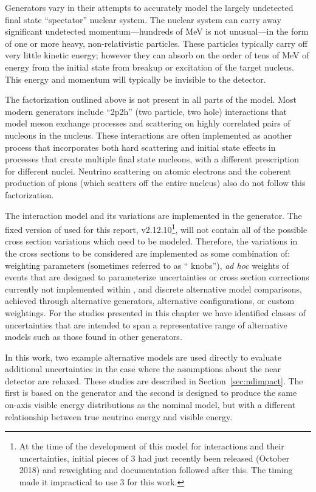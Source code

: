 Generators vary in their attempts to accurately model the largely undetected final state ``spectator'' nuclear system.  The nuclear system can carry away significant undetected momentum---hundreds of MeV is not unusual---in the form of one or more heavy, non-relativistic particles.  These particles typically carry off very little kinetic energy; however they can absorb on the order of tens of MeV of energy from the initial state from breakup or excitation of the target nucleus.  This energy and momentum will typically be invisible to the detector.


The factorization outlined above is not present in all parts of the model.  Most modern generators include ``2p2h'' (two particle, two hole) interactions that model meson exchange processes and scattering on highly correlated pairs of nucleons in the nucleus.  These interactions are often implemented as another process that incorporates both hard scattering and initial state effects in processes that create multiple final state nucleons, with a different prescription for different nuclei.
Neutrino scattering on atomic electrons and the coherent production of pions (which scatters off the entire nucleus) also
do not follow this factorization.

The interaction model and its variations are implemented in the   generator.  The fixed version of  used for this report, v2.12.10\footnote{At the time of the development of this model for interactions and their uncertainties, initial pieces of  3 had just recently been released (October 2018) and reweighting and documentation followed after this. The timing made it impractical to use  3 for this work.}, will not contain all of the possible cross section variations which need to be modeled.  Therefore, the variations in the cross sections to be considered are implemented as some combination of:  weighting parameters (sometimes referred to as `` knobs''), {\em ad hoc} weights of events that are designed to parameterize uncertainties or cross section corrections currently not implemented within , and discrete alternative model comparisons, achieved through alternative generators, alternative  configurations, or custom weightings. For the studies presented in this chapter we have  identified classes of uncertainties that are intended to span a representative range of alternative models such as those found in other generators. 

In this work, two example alternative models are used directly to evaluate additional uncertainties in the case where the assumptions about the near detector are relaxed. These studies are described in Section~\ref{sec:ndimpact}. The first is based on the  generator and the second is designed to produce the same on-axis visible energy distributions as the nominal model, but with a different relationship between true neutrino energy and visible energy.


